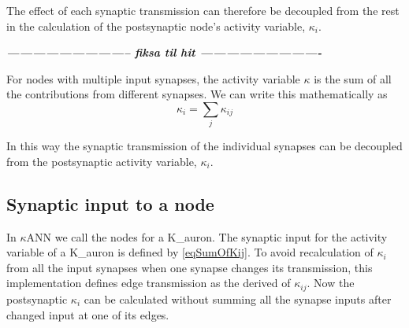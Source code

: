 		The effect of each synaptic transmission can therefore be decoupled from the rest in the calculation of the postsynaptic node's activity variable, $\kappa_i$.

\emph{\bf\large{{----------------------------- fiksa til hit ----------------------------}}}





		For nodes with multiple input synapses, the activity variable $\kappa$ is the sum of all the contributions from different synapses. %
		We can write this mathematically as 
		\begin{equation}
			\label{eqSumOfKij}
			\kappa_i = \sum_j{\kappa_{ij}}
		\end{equation}

		In this way the synaptic transmission of the individual synapses can be decoupled from the postsynaptic activity variable, $\kappa_i$.
		
	\subsection{Synaptic input to a node}
			\label{ssecSynInputToANode}
			In $\kappa$ANN we call the nodes for a K\_auron.
			The synaptic input for the activity variable of a K\_auron is defined by \eqref{eqSumOfKij}.
			To avoid recalculation of $\kappa_i$ from all the input synapses when one synapse changes its transmission, this implementation defines edge transmission as the derived of $\kappa_{ij}$.
			Now the postsynaptic $\kappa_i$ can be calculated without summing all the synapse inputs after changed input at one of its edges.

